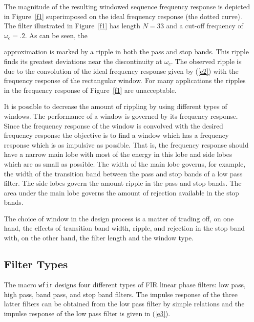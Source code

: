 The magnitude of the resulting windowed sequence frequency response 
is depicted in Figure~\ref{f1} superimposed on the ideal frequency
response (the dotted curve).  The filter illustrated in Figure~\ref{f1} 
has length $N=33$ and
a cut-off frequency of $\omega_c=.2$.  As can be seen, the 
%

%
approximation is marked by a ripple in both the pass
and stop bands.  This ripple finds its greatest deviations near the discontinuity
at $\omega_c$.  The observed ripple is due to the convolution of the
ideal frequency response given by (\ref{e2}) with the frequency response
of the rectangular window.  For many applications the ripples in the frequency 
response of Figure~\ref{f1} are unacceptable.

It is possible to decrease the amount of rippling by using different 
types of windows.
The performance of a window is governed by its frequency response.
Since the
frequency response of the window is convolved with the 
desired frequency response the 
objective is to find a window which has a frequency response which
is as impulsive as possible.  That is,  the frequency response 
should have a narrow main lobe with most of the energy
in this lobe and side lobes which are as small as possible.
The width of the main lobe governs, for example, the width
of the transition band between the pass and stop 
bands of a low pass filter.  The side lobes govern the amount 
ripple in the pass and stop bands.  The area under the main lobe
governs the amount of rejection available in
the stop bands. 

The choice of window in the design process is a matter
of trading off, on one hand, the effects of 
transition band width, ripple, and rejection in the stop band with,
on the other hand, the filter length and the window type.

\subsection{Filter Types}
\label{s2}

The macro {\tt wfir} designs four different types
of FIR linear phase filters: low pass, high pass,
band pass, and stop band filters.  The impulse response of the three
latter filters can be obtained from the low pass filter by
simple relations and the impulse response of the
low pass filter is given in (\ref{e3}).


